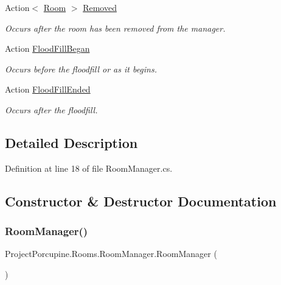 \begin{DoxyCompactItemize}
Action$<$ \hyperlink{class_project_porcupine_1_1_rooms_1_1_room}{Room} $>$ \hyperlink{class_project_porcupine_1_1_rooms_1_1_room_manager_af499628911e02ea630620f63c2dec68d}{Removed}
\begin{DoxyCompactList}\small\item\em Occurs after the room has been removed from the manager. \end{DoxyCompactList}\item 
Action \hyperlink{class_project_porcupine_1_1_rooms_1_1_room_manager_a20b42ad78ff8996e457123cfb5cf0a0b}{Flood\+Fill\+Began}
\begin{DoxyCompactList}\small\item\em Occurs before the floodfill or \textquotesingle{}as it begins\textquotesingle{}. \end{DoxyCompactList}\item 
Action \hyperlink{class_project_porcupine_1_1_rooms_1_1_room_manager_aeb63c8447353bd50a2d9608bfc0f6d52}{Flood\+Fill\+Ended}
\begin{DoxyCompactList}\small\item\em Occurs after the floodfill. \end{DoxyCompactList}\end{DoxyCompactItemize}


\subsection{Detailed Description}


Definition at line 18 of file Room\+Manager.\+cs.



\subsection{Constructor \& Destructor Documentation}
\mbox{\label{class_project_porcupine_1_1_rooms_1_1_room_manager_a8ce3c0a3d7904fe5c78439d87a1e49ff}} 
\subsubsection{\texorpdfstring{Room\+Manager()}{RoomManager()}}
{\footnotesize\ttfamily Project\+Porcupine.\+Rooms.\+Room\+Manager.\+Room\+Manager (\begin{DoxyParamCaption}{ }\end{DoxyParamCaption})}



